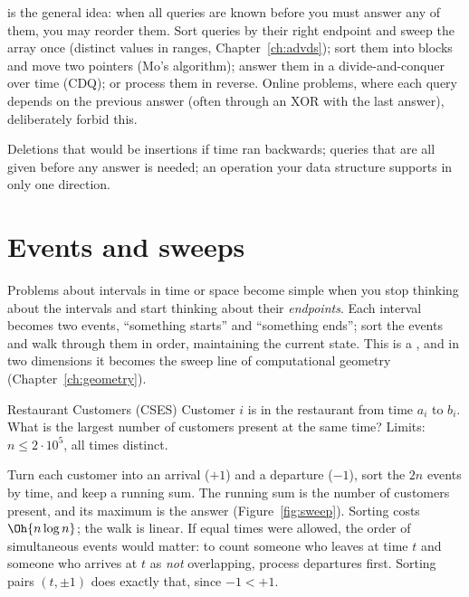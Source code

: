  is the general idea: when all queries are known before you must answer any of them, you may
reorder them. Sort queries by their right endpoint and sweep the array once (distinct values in ranges,
Chapter~\ref{ch:advds}); sort them into blocks and move two pointers (Mo's algorithm); answer them in a divide-and-conquer
over time (CDQ); or process them in reverse. Online problems, where each query depends on the previous answer (often through
an XOR with the last answer), deliberately forbid this.

\begin{recognize}
Deletions that would be insertions if time ran backwards; queries that are all given before any answer is needed; an
operation your data structure supports in only one direction.
\end{recognize}

\section[Events and sweeps]{Events and sweeps \hfill \silver}\label{sec:events}

Problems about intervals in time or space become simple when you stop thinking about the intervals and start thinking
about their \emph{endpoints}. Each interval becomes two events, ``something starts'' and ``something ends''; sort the events
and walk through them in order, maintaining the current state. This is a , and in two dimensions it becomes the
sweep line of computational geometry (Chapter~\ref{ch:geometry}).

\begin{problem}{Restaurant Customers (CSES)}
Customer $i$ is in the restaurant from time $a_i$ to $b_i$. What is the largest number of customers present at the same
time? Limits: $n \le 2\cdot10^5$, all times distinct.
\end{problem}

Turn each customer into an arrival ($+1$) and a departure ($-1$), sort the $2n$ events by time, and keep a running sum.
The running sum is the number of customers present, and its maximum is the answer (Figure~\ref{fig:sweep}). Sorting costs
$\Oh{n \log n}$; the walk is linear. If equal times were allowed, the order of simultaneous events would matter: to count
someone who leaves at time $t$ and someone who arrives at $t$ as \emph{not} overlapping, process departures first. Sorting
pairs $(t, \pm 1)$ does exactly that, since $-1 < +1$.

